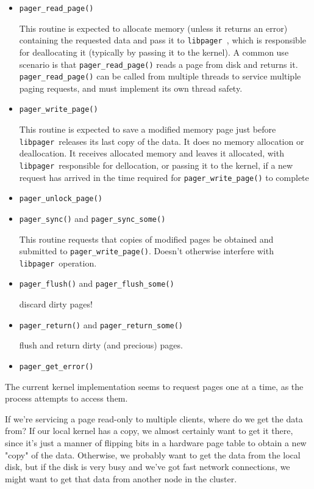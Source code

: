 \documentclass{article}
\def\libpager{{\tt libpager\ }}
\begin{document}
\begin{itemize}

\item {\tt pager_read_page()}

This routine is expected to allocate memory (unless it returns an
error) containing the requested data and pass it to \libpager, which
is responsible for deallocating it (typically by passing it to the
kernel).  A common use scenario is that {\tt pager_read_page()}
reads a page from disk and returns it.  {\tt pager_read_page()}
can be called from multiple threads to service multiple paging
requests, and must implement its own thread safety.

\item {\tt pager_write_page()}

This routine is expected to save a modified memory page just before
\libpager releases its last copy of the data.  It does no memory
allocation or deallocation.  It receives allocated memory and leaves
it allocated, with \libpager responsible for dellocation, or passing
it to the kernel, if a new request has arrived in the time required
for {\tt pager_write_page()} to complete

\item {\tt pager_unlock_page()}

\item {\tt pager_sync()} and {\tt pager_sync_some()}

This routine requests that copies of modified pages be obtained
and submitted to {\tt pager_write_page()}.  Doesn't otherwise
interfere with \libpager operation.

\item {\tt pager_flush()} and {\tt pager_flush_some()}

discard dirty pages!

\item {\tt pager_return()} and {\tt pager_return_some()}

 flush and return dirty (and precious) pages.

\item {\tt pager_get_error()}

\end{itemize}

The current kernel implementation seems to request pages one at
a time, as the process attempts to access them.

If we're servicing a page read-only to multiple clients, where do we
get the data from?  If our local kernel has a copy, we almost
certainly want to get it there, since it's just a manner of flipping
bits in a hardware page table to obtain a new "copy" of the data.
Otherwise, we probably want to get the data from the local disk, but
if the disk is very busy and we've got fast network connections, we
might want to get that data from another node in the cluster.
\end{document}
